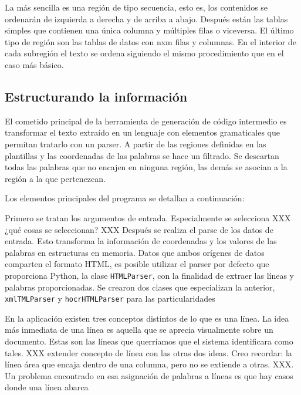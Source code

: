 La más sencilla es una región de tipo secuencia, esto es, los contenidos se ordenarán de izquierda a derecha y de arriba a abajo. Después están las tablas simples que contienen una única columna y múltiples filas o viceversa. El último tipo de región son las tablas de datos con nxm filas y columnas. En el interior de cada subregión el texto se ordena siguiendo el mismo procedimiento que en el caso más básico.


\subsection{Estructurando la información}

El cometido principal de la herramienta de generación de código intermedio es transformar el texto extraído en un lenguaje con elementos gramaticales que permitan tratarlo con un parser. A partir de las regiones definidas en las plantillas y las coordenadas de las palabras se hace un filtrado. Se descartan todas las palabras que no encajen en ninguna región, las demás se asocian a la región a la que pertenezcan.

Los elementos principales del programa se detallan a continuación:

Primero se tratan los argumentos de entrada. Especialmente se selecciona XXX ¿qué cosas se seleccionan? XXX
Después se realiza el parse de los datos de entrada. Esto transforma la información de coordenadas y los valores de las palabras en estructuras en memoria. Datos que ambos orígenes de datos comparten el formato HTML, es posible utilizar el parser por defecto que proporciona Python, la clase \verb|HTMLParser|, con la finalidad de extraer las líneas y palabras proporcionadas. Se crearon dos clases que especializan la anterior, \verb|xmlTMLParser| y \verb|hocrHTMLParser| para las particularidades %

En la aplicación existen tres conceptos distintos de lo que es una línea. La idea más inmediata de una línea es aquella que se aprecia visualmente sobre un documento. Estas son las líneas que querríamos que el sistema identificara como tales. XXX extender concepto de línea con las otras dos ideas. Creo recordar: la línea área que encaja dentro de una columna, pero no se extiende a otras. XXX. Un problema encontrado en esa asignación de palabras a líneas es que hay casos donde una línea abarca %

